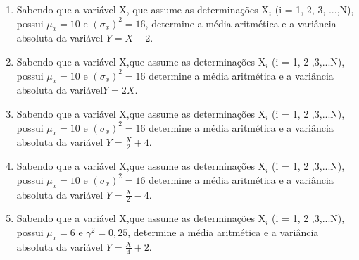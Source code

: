 \begin{enumerate}
\item Sabendo que a variável X, que assume as determinações X$_{i}$ (i = 1, 2, 3, ...,N), possui $\mu _{x} = 10$ e $(\sigma _{x})^2 =16$, determine a média aritmética e a variância absoluta da variável $Y =X + 2$.

\item Sabendo que a variável X,que assume as determinações X$_{i}$ (i = 1, 2 ,3,...N), possui $\mu _{x} = 10$ e $(\sigma _{x})^2 =16$ determine a média aritmética e a variância absoluta da variável$Y= 2X$.

\item Sabendo que a variável X,que assume as determinações X$_{i}$ (i = 1, 2 ,3,...N), possui $\mu _{x} = 10$ e $(\sigma _{x})^2 =16$ determine a média aritmética e a variância absoluta da variável $Y= \frac{X}{2} + 4$.

\item Sabendo que a variável X,que assume as determinações X$_{i}$ (i = 1, 2 ,3,...N), possui $\mu _{x} = 10$ e $(\sigma _{x})^2 =16$ determine a média aritmética e a variância absoluta da variável $Y= \frac{X}{2} - 4$.

\item Sabendo que a variável X,que assume as determinações X$_{i}$ (i = 1, 2 ,3,...N), possui $\mu _{x} = 6$ e $\gamma ^2 =0,25$, determine a média aritmética e a variância absoluta da variável $Y= \frac{X}{4} + 2$.



\end{enumerate}  